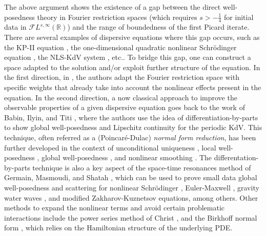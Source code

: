 \documentclass[a4paper,
11pt,  reqno]{amsart}
\newcommand{\5}{\textup{V}}
\theoremstyle{remark}
\newcommand{\R}{\mathbb{R}}
\numberwithin{equation}{section}
\numberwithin{theorem}{section}
\begin{document}
	\medskip
	The above argument shows the existence of a gap between the direct well-posedness theory in Fourier restriction spaces (which requires $s>-\frac14$ for initial data in $\mathcal{F}L^{s,\infty}(\R)$) and the range of boundedness of the first Picard iterate. There are several examples of dispersive equations where this gap occurs, such as the KP-II equation \cite{hadac, HHK_kpii}, the one-dimensional quadratic nonlinear Schrödinger equation \cite{taobejenaru, OS12}, the NLS-KdV system \cite{CLS}, etc..
To bridge this gap, one can construct a space adapted to the solution and/or exploit further structure of the equation.
In the first direction,
in \cite{taobejenaru, hadac, HHK_kpii}, the authors adapt the Fourier restriction space with specific weights that already take into account the nonlinear effects present in the equation.
In the second direction, a now classical approach to improve the observable properties of a given dispersive equation goes back to the work of Babin, Ilyin, and Titi \cite{bit}, where the authors use the idea of differentiation-by-parts to show global well-posedness and Lipschitz continuity for the periodic KdV.
This technique, often referred as a (Poincaré-Dulac) \emph{normal form reduction},
has been further developed in the context of unconditional uniqueness \cite{GuoKwonOh_nls, kishimoto, KwonOh_uu_mkdv, KOY20}, local well-posedness \cite{CLS}, global well-posedness \cite{CGKO_normal_form, IfrimTataru}, and nonlinear smoothing \cite{CKV, CS20,  ErdoganTzirakis_kdv, ErdoganTzirakis_nls, McConnel_nls}.
The differentation-by-parts technique is also a key aspect of the space-time resonances method of Germain, Masmoudi, and Shatah \cite{GMS_nls_3d}, which can be used to prove small data global well-posedness and scattering for nonlinear Schr\"odinger \cite{katopusateri}, Euler-Maxwell \cite{GermainMasmoudi_euler_maxwell}, gravity water waves \cite{GMS_gravity}, and modified Zakharov-Kuznetsov \cite{anjolras} equations, among others.
 Other methods to expand the nonlinear terms and avoid certain problematic interactions include the power series method of Christ \cite{Christ_power}, and the Birkhoff normal form \cite{Bambusi_birkhoff, bourg_birkhoff_normal, CollianderKwonOh_birkhoff}, which relies on the Hamiltonian structure of the underlying PDE.


\medskip
\end{document}
